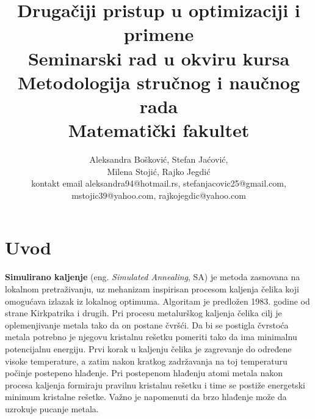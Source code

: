 \documentclass[a4paper]{article}
\begin{document}
\title{Drugačiji pristup u optimizaciji i primene\\ \small{Seminarski rad u okviru kursa\\Metodologija stručnog i naučnog rada\\ Matematički fakultet}}

\author{Aleksandra Bošković, Stefan Jaćović,\\Milena Stojić, Rajko Jegdić\\ kontakt email aleksandra94@hotmail.rs, stefanjacovic25@gmail.com,\\mstojic39@yahoo.com, rajkojegdic@yahoo.com}


\maketitle


\tableofcontents

\newpage

\section{Uvod}
\label{sec:uvod}

\textbf{Simulirano kaljenje} (eng. \textit{Simulated Annealing}, SA) je metoda zasnovana na lokalnom pretraživanju, uz mehanizam inspirisan procesom kaljenja čelika koji omogućava izlazak iz lokalnog optimuma. Algoritam je predložen 1983. godine od strane Kirkpatrika i drugih.\cite{sa_history_book}
Pri procesu metalurškog kaljenja čelika cilj je oplemenjivanje metala tako da on postane čvršći. Da bi se postigla čvrstoća metala potrebno je njegovu kristalnu rešetku pomeriti tako da ima minimalnu potencijalnu energiju. Prvi korak u kaljenju čelika je zagrevanje do
određene visoke temperature, a zatim nakon kratkog zadržavanja na toj temperaturu počinje postepeno hlađenje. Pri postepenom hlađenju atomi metala nakon procesa kaljenja formiraju
pravilnu kristalnu rešetku i time se postiže energetski minimum kristalne rešetke. Važno je napomenuti da brzo hlađenje može da uzrokuje pucanje metala.
\end{document}
